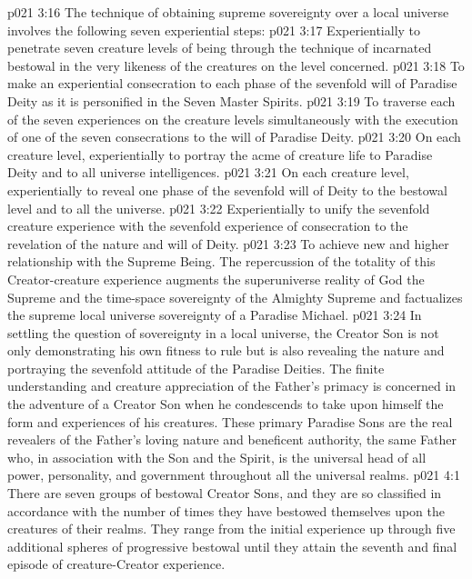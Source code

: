 \vs p021 3:16 \pc The technique of obtaining supreme sovereignty over a local universe involves the following seven experiential steps:
\vs p021 3:17 \bibnobreakspace Experientially to penetrate seven creature levels of being through the technique of incarnated bestowal in the very likeness of the creatures on the level concerned.
\vs p021 3:18 \bibnobreakspace To make an experiential consecration to each phase of the sevenfold will of Paradise Deity as it is personified in the Seven Master Spirits.
\vs p021 3:19 \bibnobreakspace To traverse each of the seven experiences on the creature levels simultaneously with the execution of one of the seven consecrations to the will of Paradise Deity.
\vs p021 3:20 \bibnobreakspace On each creature level, experientially to portray the acme of creature life to Paradise Deity and to all universe intelligences.
\vs p021 3:21 \bibnobreakspace On each creature level, experientially to reveal one phase of the sevenfold will of Deity to the bestowal level and to all the universe.
\vs p021 3:22 \bibnobreakspace Experientially to unify the sevenfold creature experience with the sevenfold experience of consecration to the revelation of the nature and will of Deity.
\vs p021 3:23 \bibnobreakspace To achieve new and higher relationship with the Supreme Being. The repercussion of the totality of this Creator\hyp{}creature experience augments the superuniverse reality of God the Supreme and the time\hyp{}space sovereignty of the Almighty Supreme and factualizes the supreme local universe sovereignty of a Paradise Michael.
\vs p021 3:24 \pc In settling the question of sovereignty in a local universe, the Creator Son is not only demonstrating his own fitness to rule but is also revealing the nature and portraying the sevenfold attitude of the Paradise Deities. The finite understanding and creature appreciation of the Father’s primacy is concerned in the adventure of a Creator Son when he condescends to take upon himself the form and experiences of his creatures. These primary Paradise Sons are the real revealers of the Father’s loving nature and beneficent authority, the same Father who, in association with the Son and the Spirit, is the universal head of all power, personality, and government throughout all the universal realms.
\vs p021 4:1 There are seven groups of bestowal Creator Sons, and they are so classified in accordance with the number of times they have bestowed themselves upon the creatures of their realms. They range from the initial experience up through five additional spheres of progressive bestowal until they attain the seventh and final episode of creature\hyp{}Creator experience.
